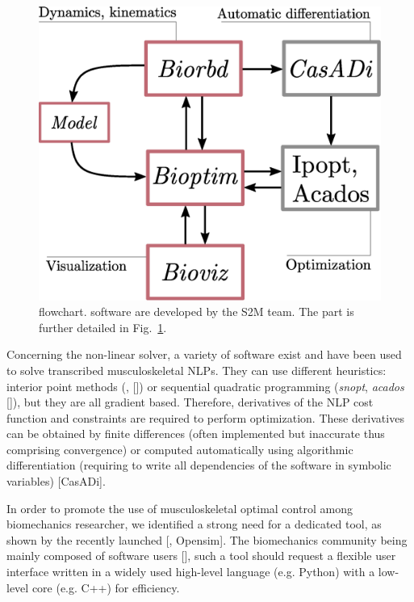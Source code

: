 \begin{figure}[t!]
\centering
\includegraphics[width=0.9\columnwidth]{figures/dependencies.eps}
\caption{\bioptim {} flowchart.  software are developed by the S2M team. The \bioptim part is further detailed in Fig.~\ref{fig:dependencies}.}
\label{fig:dependencies}
\vspace*{-0.5cm}
\end{figure}

Concerning the non-linear solver, a variety of software exist and have been used to solve transcribed musculoskeletal NLPs.
They can use different heuristics: interior point methods (\textit{}, [\addref]) or sequential quadratic programming (\textit{snopt}, \textit{acados} [\addref]), but they are all gradient based.
Therefore, derivatives of the NLP cost function and constraints are required to perform optimization.
These derivatives can be obtained by finite differences (often implemented but inaccurate thus comprising convergence) or computed automatically using algorithmic differentiation (requiring to write all dependencies of the software in symbolic variables) [CasADi].


In order to promote the use of musculoskeletal optimal control among biomechanics researcher, we identified a strong need for a dedicated tool, as shown by the recently launched  [\addref, Opensim]. 
The biomechanics community being mainly composed of software users [\addref], such a tool should request a flexible user interface written in a widely used high-level language (e.g. Python) with a low-level core (e.g. C++) for efficiency. 

